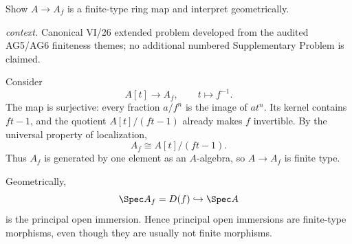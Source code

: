 \begin{problem}\label{prob:vi26-p17}
Show \(A\to A_f\) is a finite-type ring map and interpret geometrically.
\par\smallskip\noindent\textit{context.} Canonical VI/26 extended problem developed from the audited AG5/AG6 finiteness themes; no additional numbered Supplementary Problem is claimed.
\end{problem}

\ifdefined\FullProblemDossiers
\begin{solution}
Consider
\[
A[t]\longrightarrow A_f,\qquad t\longmapsto f^{-1}.
\]
The map is surjective: every fraction \(a/f^n\) is the image of \(at^n\).  Its kernel contains
\(ft-1\), and the quotient \(A[t]/(ft-1)\) already makes \(f\) invertible.  By the universal property
of localization,
\[
A_f\cong A[t]/(ft-1).
\]
Thus \(A_f\) is generated by one element as an \(A\)-algebra, so \(A\to A_f\) is finite type.

Geometrically,
\[
\Spec A_f=D(f)\hookrightarrow\Spec A
\]
is the principal open immersion.  Hence principal open immersions are finite-type morphisms, even
though they are usually not finite morphisms.
\end{solution}
\fi
